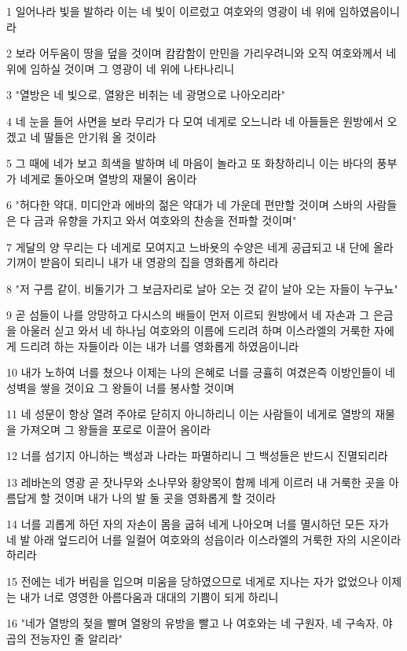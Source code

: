 \par 1 일어나라 빛을 발하라 이는 네 빛이 이르렀고 여호와의 영광이 네 위에 임하였음이니라
\par 2 보라 어두움이 땅을 덮을 것이며 캄캄함이 만민을 가리우려니와 오직 여호와께서 네 위에 임하실 것이며 그 영광이 네 위에 나타나리니
\par 3 "열방은 네 빛으로, 열왕은 비취는 네 광명으로 나아오리라"
\par 4 네 눈을 들어 사면을 보라 무리가 다 모여 네게로 오느니라 네 아들들은 원방에서 오겠고 네 딸들은 안기워 올 것이라
\par 5 그 때에 네가 보고 희색을 발하며 네 마음이 놀라고 또 화창하리니 이는 바다의 풍부가 네게로 돌아오며 열방의 재물이 옴이라
\par 6 "허다한 약대, 미디안과 에바의 젊은 약대가 네 가운데 편만할 것이며 스바의 사람들은 다 금과 유향을 가지고 와서 여호와의 찬송을 전파할 것이며"
\par 7 게달의 양 무리는 다 네게로 모여지고 느바욧의 수양은 네게 공급되고 내 단에 올라 기꺼이 받음이 되리니 내가 내 영광의 집을 영화롭게 하리라
\par 8 "저 구름 같이, 비둘기가 그 보금자리로 날아 오는 것 같이 날아 오는 자들이 누구뇨"
\par 9 곧 섬들이 나를 앙망하고 다시스의 배들이 먼저 이르되 원방에서 네 자손과 그 은금을 아울러 싣고 와서 네 하나님 여호와의 이름에 드리려 하며 이스라엘의 거룩한 자에게 드리려 하는 자들이라 이는 내가 너를 영화롭게 하였음이니라
\par 10 내가 노하여 너를 쳤으나 이제는 나의 은혜로 너를 긍휼히 여겼은즉 이방인들이 네 성벽을 쌓을 것이요 그 왕들이 너를 봉사할 것이며
\par 11 네 성문이 항상 열려 주야로 닫히지 아니하리니 이는 사람들이 네게로 열방의 재물을 가져오며 그 왕들을 포로로 이끌어 옴이라
\par 12 너를 섬기지 아니하는 백성과 나라는 파멸하리니 그 백성들은 반드시 진멸되리라
\par 13 레바논의 영광 곧 잣나무와 소나무와 황양목이 함께 네게 이르러 내 거룩한 곳을 아름답게 할 것이며 내가 나의 발 둘 곳을 영화롭게 할 것이라
\par 14 너를 괴롭게 하던 자의 자손이 몸을 굽혀 네게 나아오며 너를 멸시하던 모든 자가 네 발 아래 엎드리어 너를 일컬어 여호와의 성읍이라 이스라엘의 거룩한 자의 시온이라 하리라
\par 15 전에는 네가 버림을 입으며 미움을 당하였으므로 네게로 지나는 자가 없었으나 이제는 내가 너로 영영한 아름다움과 대대의 기쁨이 되게 하리니
\par 16 "네가 열방의 젖을 빨며 열왕의 유방을 빨고 나 여호와는 네 구원자, 네 구속자, 야곱의 전능자인 줄 알리라"
